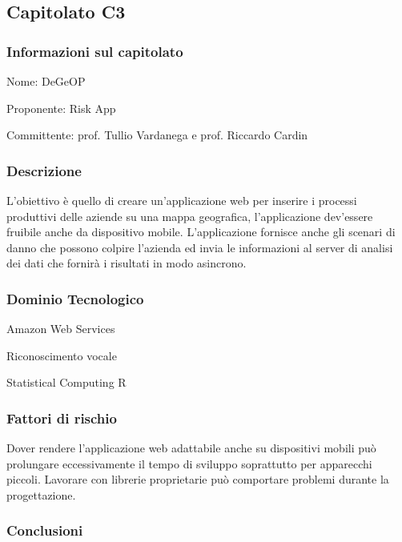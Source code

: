 \subsection{Capitolato C3}

\subsubsection{Informazioni sul capitolato}
\begin{trivlist}
	\setlength{\itemindent}{+.3in}
	\item  Nome: DeGeOP
	\item  Proponente: Risk App
	\item  Committente: prof. Tullio Vardanega e prof. Riccardo Cardin
\end{trivlist}

\subsubsection{Descrizione}

L'obiettivo è quello di creare un'applicazione web per inserire i processi produttivi delle aziende su una mappa geografica, l'applicazione dev'essere fruibile anche da dispositivo mobile.
L'applicazione fornisce anche gli scenari di danno che possono colpire l’azienda ed invia le informazioni al server di analisi dei dati che fornirà i risultati in modo asincrono.


\subsubsection{Dominio Tecnologico}
\begin{trivlist}
	\item  Amazon Web Services
	\item  Riconoscimento vocale
	\item  Statistical Computing R
\end{trivlist}

\subsubsection{Fattori di rischio}

Dover rendere l'applicazione web adattabile anche su dispositivi mobili può prolungare eccessivamente il tempo di sviluppo soprattutto per apparecchi piccoli.
Lavorare con librerie proprietarie può comportare problemi durante la progettazione.

\subsubsection{Conclusioni}

